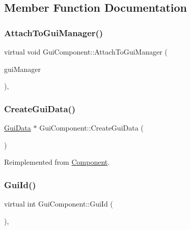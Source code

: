 \subsection{Member Function Documentation}
\mbox{\label{class_gui_component_a34ffc6f2ca0ce6f58c9fb6a2fd3e1a32}} 
\subsubsection{\texorpdfstring{AttachToGuiManager()}{AttachToGuiManager()}}
{\footnotesize\ttfamily virtual void Gui\+Component\+::\+Attach\+To\+Gui\+Manager (\begin{DoxyParamCaption}\item[{\mbox{\hyperlink{class_gui_manager}{Gui\+Manager}} $\ast$}]{gui\+Manager }\end{DoxyParamCaption})\hspace{0.3cm}{\ttfamily [inline]}, {\ttfamily [virtual]}}

\mbox{\label{class_gui_component_a11b7920b50fe9e10a7f2450a79e03647}} 
\subsubsection{\texorpdfstring{CreateGuiData()}{CreateGuiData()}}
{\footnotesize\ttfamily \mbox{\hyperlink{class_gui_data}{Gui\+Data}} $\ast$ Gui\+Component\+::\+Create\+Gui\+Data (\begin{DoxyParamCaption}{ }\end{DoxyParamCaption})\hspace{0.3cm}{\ttfamily [virtual]}}



Reimplemented from \mbox{\hyperlink{class_component_a634070ac3118a22828bd3c130f27cf2a}{Component}}.

\mbox{\label{class_gui_component_a57b8809f4ce6a4e238c5b87c158da99b}} 
\subsubsection{\texorpdfstring{GuiId()}{GuiId()}}
{\footnotesize\ttfamily virtual int Gui\+Component\+::\+Gui\+Id (\begin{DoxyParamCaption}{ }\end{DoxyParamCaption})\hspace{0.3cm}{\ttfamily [inline]}, {\ttfamily [virtual]}}

